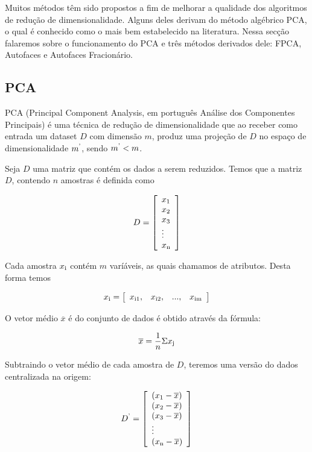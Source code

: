 \documentclass[12pt]{article}
\begin{document}
Muitos métodos têm sido propostos a fim de melhorar a qualidade dos algoritmos de redução de dimensionalidade. Alguns deles derivam do método algébrico PCA, o qual é conhecido como o mais bem estabelecido na literatura. Nessa secção falaremos sobre o funcionamento do PCA e três métodos derivados dele: FPCA, Autofaces e Autofaces Fracionário.

\subsection{PCA}

PCA (Principal Component Analysis, em português Análise dos Componentes Principais) é  uma técnica de redução de dimensionalidade que ao receber como entrada um dataset $D$ com dimensão $m$, produz uma projeção de $D$ no espaço de dimensionalidade $m\textsuperscript{'}$, sendo $m\textsuperscript{'} < m$.

Seja $D$ uma matriz que contém os dados a serem reduzidos. Temos que a matriz $D$, contendo $n$ amostras é definida como

$$
D = \left[
\begin{array}{l}
x\textsubscript{1}\\
x\textsubscript{2}\\
x\textsubscript{3}\\
\vdots\\
x\textsubscript{n}
\end{array}
\right]
$$

Cada amostra $x\textsubscript{i}$ contém $m$ varíáveis, as quais chamamos de atributos. Desta forma temos

$$
x\textsubscript{i} = \left[
\begin{array}{cccc}
x\textsubscript{i1}, &
x\textsubscript{i2}, &
..., &
x\textsubscript{im}
\end{array}
\right]
$$

O vetor médio $\overline{x}$ é do conjunto de dados é obtido através da fórmula:

$$
\overline{x} = \frac{1}{n} \Sigma x\textsubscript{j}
$$

Subtraindo o vetor médio de cada amostra de $D$, teremos uma versão do dados centralizada na origem:

$$
D\textsuperscript{'} = \left[
\begin{array}{l}
(x\textsubscript{1} - \overline{x})\\
(x\textsubscript{2} - \overline{x})\\
(x\textsubscript{3} - \overline{x})\\
\vdots\\
(x\textsubscript{n} - \overline{x})
\end{array}
\right]
$$
\end{document}
